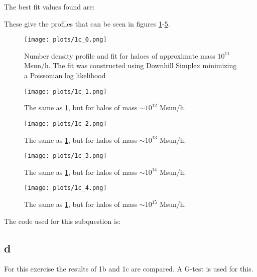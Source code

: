 The best fit values found are:


These give the profiles that can be seen in figures \ref{fig:ex1c_0}-\ref{fig:ex1c_4}.
\begin{figure}
    \centering
    \texttt{[image: plots/1c\_0.png]}
    \caption{Number density profile and fit for haloes of approximate mass $10^{11}$ Msun/h. The fit was constructed using Downhill Simplex minimizing a Poissonian log likelihood}
    \label{fig:ex1c_0}
\end{figure}
\begin{figure}
    \centering
    \texttt{[image: plots/1c\_1.png]}
    \caption{The same as \ref{fig:ex1c_0}, but for halos of mass $\sim 10^{12}$ Msun/h.}
    \label{fig:ex1c_1}
\end{figure}
\begin{figure}
    \centering
    \texttt{[image: plots/1c\_2.png]}
    \caption{The same as \ref{fig:ex1c_0}, but for halos of mass $\sim 10^{13}$ Msun/h.}
    \label{fig:ex1c_2}
\end{figure}
\begin{figure}
    \centering
    \texttt{[image: plots/1c\_3.png]}
    \caption{The same as \ref{fig:ex1c_0}, but for halos of mass $\sim 10^{14}$ Msun/h.}
    \label{fig:ex1c_3}
\end{figure}
\begin{figure}
    \centering
    \texttt{[image: plots/1c\_4.png]}
    \caption{The same as \ref{fig:ex1c_0}, but for halos of mass $\sim 10^{15}$ Msun/h.}
    \label{fig:ex1c_4}
\end{figure}

The code used for this subquestion is:


\subsection*{d}
For this exercise the results of 1b and 1c are compared.
A G-test is used for this.


